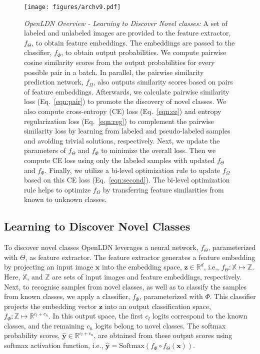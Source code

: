 \documentclass[runningheads]{eccv2022submission}
\begin{document}
\begin{figure*}[t]
\vspace{2mm}
\begin{center}
  \texttt{[image: figures/archv9.pdf]}
\end{center}
\vspace{-2mm}
\caption{\small\emph{OpenLDN Overview - Learning to Discover Novel classes:} A set of labeled and unlabeled images are provided to the feature extractor, $f_\Theta$, to obtain feature embeddings. The embeddings are passed to the classifier, $f_\Phi$, to obtain output probabilities. We compute pairwise cosine similarity scores from the output probabilities for every possible pair in a batch. In parallel, the pairwise similarity prediction network, $f_\Omega$, also outputs similarity scores based on pairs of feature embeddings. Afterwards, we calculate pairwise similarity loss (Eq.~\ref{eqn:pair}) to promote the discovery of novel classes. We also compute cross-entropy (CE) loss (Eq.~\ref{eqn:ce}) and entropy regularization loss (Eq.~\ref{eqn:reg}) to complement the pairwise similarity loss by learning from labeled and pseudo-labeled samples and avoiding trivial solutions, respectively. Next, we update the parameters of $f_\Theta$ and $f_\Phi$ to minimize the overall loss. Then we compute CE loss using only the labeled samples with updated $f_\Theta$ and $f_\Phi$. Finally, we utilize a bi-level optimization rule to update $f_\Omega$ based on this CE loss (Eq.~\ref{eqn:second}). The bi-level optimization rule helps to optimize $f_\Omega$ by transferring feature similarities from known to unknown classes.}
\vspace{-2mm}
\label{fig:arch}
\end{figure*}

\vspace{-4mm}
\subsection{Learning to Discover Novel Classes}
To discover novel classes OpenLDN leverages a neural network, $f_\Theta$, parameterized with $\Theta$, as feature extractor. The feature extractor generates a feature embedding by projecting an input image $\mathbf{x}$ into the embedding space, $\mathbf{z}\in\mathbb{R}^d$, i.e., $f_\Theta:\mathbb{X}\mapsto\mathbb{Z}$. Here, $\mathbb{X}$, and $\mathbb{Z}$ are sets of input images and feature embeddings, respectively. Next, to recognise samples from novel classes, as well as to classify the samples from known classes, we apply a classifier, $f_\Phi$, parameterized with $\Phi$. This classifier projects the embedding vector $\mathbf{z}$ into an output classification space,  $f_\Phi: \mathbb{Z}\mapsto \mathbb{R}^{{c_l} + {c_n}}$. In this output space, the first $c_l$ logits correspond to the known classes, and the remaining $c_n$ logits belong to novel classes. The softmax probability scores, $\mathbf{\hat{y}} \in \mathbb{R}^{{c_l} + {c_n}}$, are obtained from these output scores using softmax activation function, i.e., $\mathbf{\hat{y}}=\mathrm{Softmax}(f_{\Phi}\circ f_{\Theta}(\mathbf{x}))$. 
\end{document}
